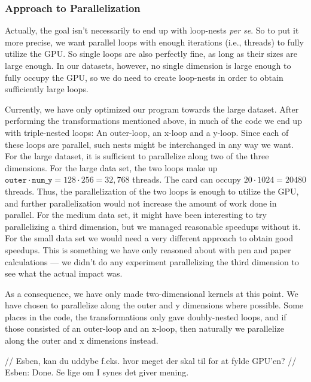 \documentclass[11pt]{article}
\begin{document}
\subsubsection{Approach to Parallelization}
\label{sec:approach}
Actually, the goal isn't necessarily to end up with loop-nests \emph{per se}. So to put it more precise, we want parallel loops with enough iterations (i.e., threads) to fully utilize the GPU.
So single loops are also perfectly fine, as long as their sizes are large enough.
In our datasets, however, no single dimension is large enough to fully occupy the GPU, so we do need to create loop-nests in order to obtain sufficiently large loops.

Currently, we have only optimized our program towards the large dataset.
After performing the transformations mentioned above, in much of the code we end up with triple-nested loops: An outer-loop, an x-loop and a y-loop. Since each of these loops are parallel, such nests might be interchanged in any way we want. For the large dataset, it is sufficient to parallelize along two of the three dimensions.
For the large data set, the two loops make up $\mathtt{outer} \cdot \mathtt{num\_y} = 128 \cdot 256 = 32,768$ threads.
The card can occupy $20 \cdot 1024 = 20480$ threads.
Thus, the parallelization of the two loops is enough to utilize the GPU, and further parallelization would not increase the amount of work done in parallel.
For the medium data set, it might have been interesting to try parallelizing a third dimension, but we managed reasonable speedups without it.
For the small data set we would need a very different approach to obtain good speedups.
This is something we have only reasoned about with pen and paper calculations --- we didn't do any experiment parallelizing the third dimension to see what the actual impact was.

As a consequence, we have only made two-dimensional kernels at this point. We have chosen to parallelize along the outer and y dimensions where possible. Some places in the code, the transformations only gave doubly-nested loops, and if those consisted of an outer-loop and an x-loop, then naturally we parallelize along the outer and x dimensions instead.

// Esben, kan du uddybe f.eks. hvor meget der skal til for at fylde GPU'en?
// Esben: Done. Se lige om I synes det giver mening.

\end{document}
